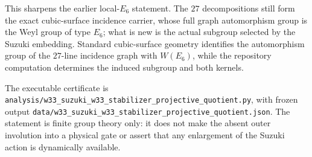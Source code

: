This sharpens the earlier local-$E_6$ statement.  The $27$ decompositions still
form the exact cubic-surface incidence carrier, whose full graph automorphism
group is the Weyl group of type $E_6$; what is new is the actual subgroup
selected by the Suzuki embedding.  Standard cubic-surface geometry identifies
the automorphism group of the $27$-line incidence graph with $W(E_6)$, while
the repository computation determines the induced subgroup and both kernels.

The executable certificate is
\texttt{analysis/w33\_suzuki\_w33\_stabilizer\_projective\_quotient.py}, with
frozen output
\texttt{data/w33\_suzuki\_w33\_stabilizer\_projective\_quotient.json}.
The statement is finite group theory only: it does not make the absent outer
involution into a physical gate or assert that any enlargement of the Suzuki
action is dynamically available.
